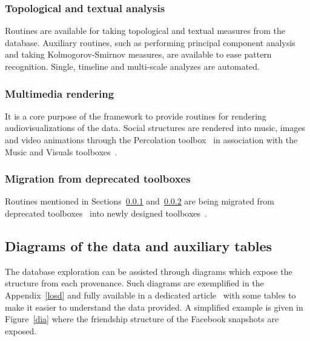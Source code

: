 \subsubsection{Topological and textual analysis}\label{ana}
Routines are available for taking topological and textual measures from
the database.
Auxiliary routines, such as performing principal component analysis
and taking Kolmogorov-Smirnov measures, are available
to ease pattern recognition.
Single, timeline and multi-scale analyzes are automated.

\subsubsection{Multimedia rendering}\label{media}
It is a core purpose of the framework to provide routines for rendering
audiovisualizations of the data.
Social structures are rendered into music, images and video animations
through the Percolation toolbox~\cite{percolation} in association with
the Music and Visuals toolboxes~\cite{music,visuals}.

\subsubsection{Migration from deprecated toolboxes}
Routines mentioned in Sections~\ref{ana} and~\ref{media} are being migrated from deprecated
toolboxes~\cite{gmaneLegacy,percolationLegacy} into newly designed
toolboxes~\cite{percolation,visuals}.

\subsection{Diagrams of the data and auxiliary tables}
The database exploration can be assisted through diagrams which expose
the structure from each provenance.
Such diagrams are exemplified in the Appendix~\ref{losd} and 
fully available in a dedicated article~\cite{losd}
with some tables to make it easier to understand the data provided.
A simplified example is given in Figure~\ref{dia} where the friendship
structure of the Facebook snapshots are exposed.

